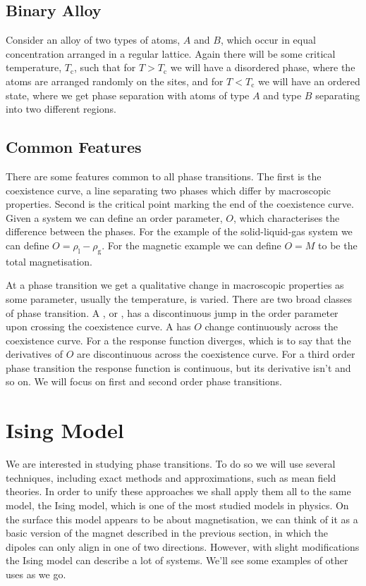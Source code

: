 \documentclass[fleqn]{NotesClass}
\begin{document}
    \section{Binary Alloy}
    Consider an alloy of two types of atoms, \(A\) and \(B\), which occur in equal concentration arranged in a regular lattice.
    Again there will be some critical temperature, \(T_{\mathrm{c}}\), such that for \(T > T_{\mathrm{c}}\) we will have a disordered phase, where the atoms are arranged randomly on the sites, and for \(T < T_{\mathrm{c}}\) we will have an ordered state, where we get phase separation with atoms of type \(A\) and type \(B\) separating into two different regions.
    
    \section{Common Features}
    There are some features common to all phase transitions.
    The first is the coexistence curve, a line separating two phases which differ by macroscopic properties.
    Second is the critical point marking the end of the coexistence curve.
    Given a system we can define an order parameter, \(O\), which characterises the difference between the phases.
    For the example of the solid-liquid-gas system we can define \(O = \rho_{\mathrm{l}} - \rho_{\mathrm{g}}\).
    For the magnetic example we can define \(O = M\) to be the total magnetisation.
    
    At a phase transition we get a qualitative change in macroscopic properties as some parameter, usually the temperature, is varied.
    There are two broad classes of phase transition.
    A , or , has a discontinuous jump in the order parameter upon crossing the coexistence curve.
    A  has \(O\) change continuously across the coexistence curve.
    For a  the response function diverges, which is to say that the derivatives of \(O\) are discontinuous across the coexistence curve.
    For a third order phase transition the response function is continuous, but its derivative isn't and so on.
    We will focus on first and second order phase transitions.
    
    \chapter{Ising Model}
    We are interested in studying phase transitions.
    To do so we will use several techniques, including exact methods and approximations, such as mean field theories.
    In order to unify these approaches we shall apply them all to the same model, the Ising model, which is one of the most studied models in physics.
    On the surface this model appears to be about magnetisation, we can think of it as a basic version of the magnet described in the previous section, in which the dipoles can only align in one  of two directions.
    However, with slight modifications the Ising model can describe a lot of systems.
    We'll see some examples of other uses as we go.
    
\end{document}

